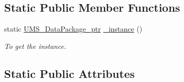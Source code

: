 \subsection*{Static Public Member Functions}
\begin{DoxyCompactItemize}
\item 
static \hyperlink{classUMS__Data_1_1UMS__DataPackage}{UMS\_\-DataPackage\_\-ptr} \hyperlink{classUMS__Data_1_1UMS__DataPackage_add041c3befcd548aa937cd6bc7efbc18}{\_\-instance} ()
\begin{DoxyCompactList}\small\item\em To get the instance. \item\end{DoxyCompactList}\end{DoxyCompactItemize}
\subsection*{Static Public Attributes}
